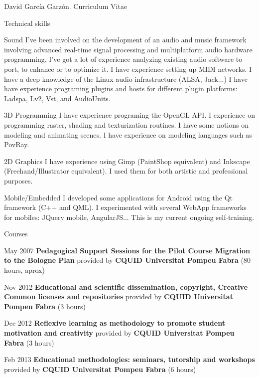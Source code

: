 \documentclass{article}
\begin{document}
\begin{cv}{David García Garzón. Curriculum Vitae}
\begin{cvlist}{Technical skills}
\item[Sound]
	I've been involved on the development of an audio and music framework involving advanced real-time signal processing and multiplatform audio hardware programming. I've got a lot of experience analyzing existing audio software to port, to enhance or to optimize it. I have experience setting up MIDI networks. I have a deep knowledge of the Linux audio infrastructure (ALSA, Jack...) I have have experience programing plugins and hosts for different plugin platforms: Ladspa, Lv2, Vst, and AudioUnits. 

\item[3D Programming]
	I have experience programing the OpenGL API. I experience on programming raster, shading and texturization routines. I have some notions on modeling and animating scenes. I have experience on modeling languages such as PovRay. 

\item[2D Graphics]
	I have experience using Gimp (PaintShop equivalent) and Inkscape (Freehand/Illustrator equivalent). I used them for both artistic and professional purposes. 

\item[Mobile/Embedded]
	I developed some applications for Android using the Qt framework (C++ and QML). I experimented with several WebApp frameworks for mobiles: JQuery mobile, AngularJS... This is my current ongoing self-training.

\end{cvlist}

\begin{cvlist}{Courses}

\item[May 2007]
	{\bf Pedagogical Support Sessions for the Pilot Course Migration to the Bologne Plan } provided by {\bf CQUID Universitat Pompeu Fabra} (80 hours, aprox)

\item[Nov 2012]
	{\bf Educational and scientific dissemination, copyright, Creative Common licenses and repositories } provided by {\bf CQUID Universitat Pompeu Fabra} (3 hours)

\item[Dec 2012]
	{\bf Reflexive learning as methodology to promote student motivation and creativity } provided by {\bf CQUID Universitat Pompeu Fabra} (3 hours)

\item[Feb 2013]
	{\bf Educational methodologies: seminars, tutorship and workshops } provided by {\bf CQUID Universitat Pompeu Fabra} (6 hours)


\end{cvlist}
\end{cv}
\end{document}

